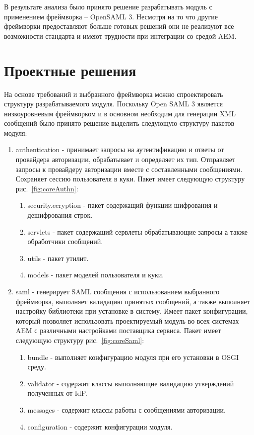 В результате анализа было принято решение разрабатывать модуль с применением фреймворка – OpenSAML 3. Несмотря на то что другие фреймворки предоставляют больше готовых решений они не реализуют все возможности стандарта и имеют трудности при интеграции со средой AEM.

\section{Проектные решения}
На основе требований и выбранного фреймворка можно спроектировать структуру разрабатываемого модуля. Поскольку Open SAML 3 является низкоуровневым фреймворком и в основном необходим для генерации XML сообщений было принято решение выделить следующую структуру пакетов модуля:

\begin{enumerate}
\item authentication - принимает запросы на аутентификацию и ответы от провайдера авторизации, обрабатывает и определяет их тип. Отправляет запросы к провайдеру авторизации вместе с составленными сообщениями. Сохраняет сессию пользователя в куки. Пакет имеет следующую структуру рис.~\ref{fig:coreAuthn}:
\begin{enumerate}
\item security.ecryption - пакет содержащий функции шифрования и дешифрования строк.
\item servlets - пакет содержащий сервлеты обрабатывающие запросы а также обработчики сообщений.
\item utils - пакет утилит.
\item models - пакет моделей пользователя и куки.
\end{enumerate}
\item saml - генерирует SAML сообщения с использованием выбранного фреймворка, выполняет валидацию принятых сообщений, а также выполняет настройку библиотеки при установке в систему. Имеет пакет конфигурации, который позволяет использовать проектируемый модуль во всех системах AEM с различными настройками поставщика сервиса. Пакет имеет следующую структуру рис.~\ref{fig:coreSaml}:
\begin{enumerate}
\item bundle - выполняет конфигурацию модуля при его установки в OSGI среду.
\item validator - содержит классы выполняющие валидацию утверждений полученных от IdP.
\item messages - содержит классы работы с сообщениями авторизации.
\item configuration - содержит конфигурации модуля.

\end{enumerate}
\end{enumerate}
